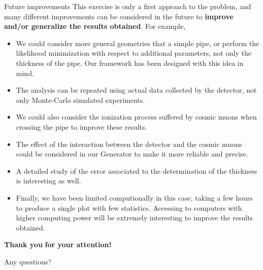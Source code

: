 \documentclass[8 pt]{beamer}
\newcommand{\backupbegin}{
   \newcounter{finalframe}
   \setcounter{finalframe}{\value{framenumber}}
}
\begin{document}
\begin{frame}{Future improvements}
\justifying
This exercise is only a first approach to the problem, and many different improvements can be considered in the future to \textbf{improve and/or generalize the results obtained}. For example,
\begin{itemize}
\justifying
\item We could consider more general geometries that a simple pipe, or perform the likelihood minimization with respect to additional parameters, not only the thickness of the pipe. Our framework has been designed with this idea in mind. 
\item The analysis can be repeated using actual data collected by the detector, not only Monte-Carlo simulated experiments.
\item We could also consider the ionization process suffered by cosmic muons when crossing the pipe to improve these results.
\item The effect of the interaction between the detector and the cosmic muons could be considered in our Generator to make it more reliable and precise.
\item A detailed study of the error associated to the determination of the thickness is interesting as well.
\item Finally, we have been limited computionally in this case, taking a few hours to produce a single plot with few statistics. Accessing to computers with higher computing power will be extremely interesting to improve the results obtained.
\end{itemize}
\end{frame}










\begin{frame}{}
	\centering
	\huge{\textbf{\color{mycolor} Thank you  \color{black}}} \newline
	\LARGE{\textbf{\color{mycolor} for your attention! \color{black}}} \vfill

	Any questions? \vfill
\end{frame}

\appendix
	\backupbegin
	
\end{document}

